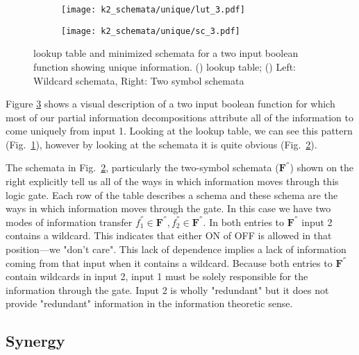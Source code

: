 \documentclass[12pt]{article} %
\newcommand{\figref}[1]{Fig.~\ref{fig:#1}}
\def\del#1{ {\color{light-gray}{#1}} }
\begin{document}
\begin{figure}[h]
    \centering
    \begin{subfigure}{0.48\textwidth}
        \centering
        \texttt{[image: k2\_schemata/unique/lut\_3.pdf]}
        \label{fig:lut3}
        \caption{\label{fig:lut3}}
    \end{subfigure}
    \begin{subfigure}{0.48\textwidth}
        \centering
        \texttt{[image: k2\_schemata/unique/sc\_3.pdf]}
        \label{fig:ts3}
        \caption{\label{fig:ts3}}
    \end{subfigure}
    \caption{lookup table and minimized schemata for a two input boolean 
    function showing unique information.
    () lookup table;
    () Left: Wildcard schemata, Right: Two symbol schemata}
    \label{fig:rule3}
\end{figure}

Figure \ref{fig:rule3} shows a visual description of a two input boolean 
function for which most of our partial information decompositions attribute all 
of the information to come uniquely from input 1. Looking at the lookup table, 
we can see this pattern (\figref{lut3}), however by looking at the schemata it 
is quite obvious (\figref{ts3}).

The schemata in \figref{ts3}, particularly the two-symbol schemata 
($\mathbf{F^{''}}$) shown on the right explicitly tell us all of the ways in 
which information moves through this logic gate. Each row of the table describes
a schema and these schema are the ways in which information moves through the 
gate. In this case we have two modes of information transfer 
$f^{''}_1 \in \mathbf{F^{''}}, f^{''}_2 \in \mathbf{F^{''}}$. In both entries 
to $\mathbf{F^{''}}$ input 2 contains a wildcard. This indicates that either 
ON of OFF is allowed in that position---we "don't care". This lack of dependence 
implies a lack of information coming from that input when it contains a wildcard. 
Because both entries to $\mathbf{F^{''}}$ contain wildcards in input 2, input 1 
must be solely responsible for the information through the gate. Input 2 is 
wholly "redundant" but it does not provide "redundant" information in the 
information theoretic sense.

\del{I want to give this kind of canalization--all states of one input 
sufficient to control transition--a name, maybe like "hard canalization" 
or something.}

\subsection{Synergy}
\end{document}
